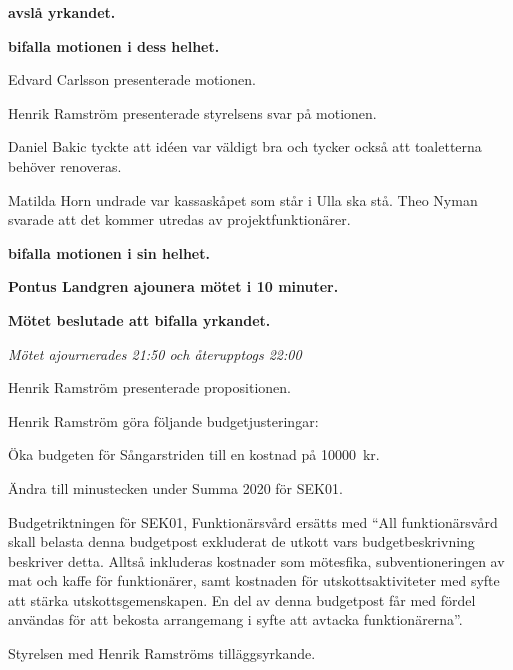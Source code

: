 \documentclass[10pt]{article}
\begin{document}
\begin{paragrafer}
\begin{paragrafer}
      \textbf{\Mba avslå yrkandet.}

      \textbf{\Mba bifalla motionen i dess helhet.}


      Edvard Carlsson presenterade motionen. 

      Henrik Ramström presenterade styrelsens svar på motionen. 
      
      Daniel Bakic tyckte att idéen var väldigt bra och tycker också att toaletterna behöver renoveras.  
      
      Matilda Horn undrade var kassaskåpet som står i Ulla ska stå. Theo Nyman svarade att det kommer utredas av projektfunktionärer.

      \textbf{\Mba bifalla motionen i sin helhet.}

      \textbf{Pontus Landgren \ypa ajounera mötet i 10 minuter.}

      \textbf{Mötet beslutade att bifalla yrkandet.}
      
      \textit{Mötet ajournerades 21:50 och återupptogs 22:00}

    \end{paragrafer}

    \begin{paragrafer}
      Henrik Ramström presenterade propositionen. 
      
      Henrik Ramström \ypa göra följande budgetjusteringar:
      \begin{dashlist}
        \item Öka budgeten för Sångarstriden till en kostnad på \SI{10000}{kr}.
        \item Ändra till minustecken under Summa 2020 för SEK01.
        \item Budgetriktningen för SEK01, Funktionärsvård ersätts med ``All funktionärsvård skall belasta denna budgetpost exkluderat de utkott vars budgetbeskrivning beskriver detta. Alltså inkluderas kostnader som mötesfika, subventioneringen av mat och kaffe för funktionärer, samt kostnaden för utskottsaktiviteter med syfte att stärka utskottsgemenskapen. En del av denna budgetpost får med fördel användas för att bekosta arrangemang i syfte att avtacka funktionärerna''.
      \end{dashlist}

      Styrelsen \js med Henrik Ramströms tilläggsyrkande.      


\end{paragrafer}
\end{paragrafer}
\end{document}
